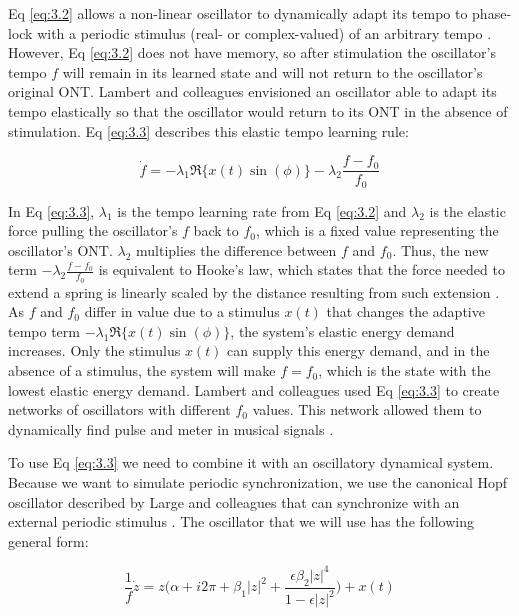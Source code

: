\documentclass{report}
\begin{document}
Eq \eqref{eq:3.2} allows a non-linear oscillator to dynamically adapt its tempo to phase-lock with a periodic stimulus (real- or complex-valued) of an arbitrary tempo \cite{righetti2006dynamic}. However, Eq \eqref{eq:3.2} does not have memory, so after stimulation the oscillator's tempo $f$ will remain in its learned state and will not return to the oscillator's original ONT. Lambert and colleagues \cite{lambert2016adaptive} envisioned an oscillator able to adapt its tempo elastically so that the oscillator would return to its ONT in the absence of stimulation. Eq \eqref{eq:3.3} describes this elastic tempo learning rule:

\begin{equation}
\dot{f} = -\lambda_1 \Re \{ x(t) \sin(\phi) \} - \lambda_2 \frac{f-f_0}{f_0} \label{eq:3.3}
\end{equation}

In Eq \eqref{eq:3.3}, $\lambda_1$ is the tempo learning rate from Eq \eqref{eq:3.2} and $\lambda_2$ is the elastic force pulling the oscillator's $f$ back to $f_0$, which is a fixed value representing the oscillator's ONT. $\lambda_2$ multiplies the difference between $f$ and $f_0$. Thus, the new term $−\lambda_2 \frac{f-f_0}{f_0}$ is equivalent to Hooke's law, which states that the force needed to extend a spring is linearly scaled by the distance resulting from such extension \cite{lambert2016adaptive}. As $f$ and $f_0$ differ in value due to a stimulus $x(t)$ that changes the adaptive tempo term $-\lambda_1 \Re \{ x(t) \sin(\phi) \}$, the system's elastic energy demand increases. Only the stimulus $x(t)$ can supply this energy demand, and in the absence of a stimulus, the system will make $f = f_0$, which is the state with the lowest elastic energy demand. Lambert and colleagues \cite{lambert2016adaptive} used Eq \eqref{eq:3.3} to create networks of oscillators with different $f_0$ values. This network allowed them to dynamically find pulse and meter in musical signals \cite{lambert2016adaptive}.

To use Eq \eqref{eq:3.3} we need to combine it with an oscillatory dynamical system. Because we want to simulate periodic synchronization, we use the canonical Hopf oscillator described by Large and colleagues that can synchronize with an external periodic stimulus \cite{large2010canonical, kim2015signal}. The oscillator that we will use has the following general form:

\begin{equation}
\frac{1}{f}\dot{z} = z\bigg(\alpha + i2\pi + \beta_1|z|^2 + \frac{\epsilon\beta_2|z|^4}{1-\epsilon|z|^2}\bigg) + x(t) \label{eq:3.4}
\end{equation}
\end{document}
